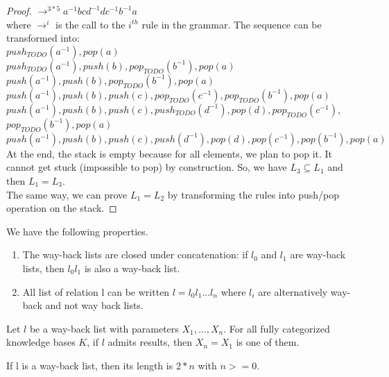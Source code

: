 \documentclass[10pt,a4paper,draft]{article}
\begin{document}
\begin{proof}
$\rightarrow^{3*5} a^{-1} b c d^{-1} d c^{-1} b^{-1} a$ \\
where $\rightarrow^i$ is the call to the $i^{th}$ rule in the grammar. The sequence can be transformed into: \\
$push_{TODO}(a^{-1}), pop(a)$ \\
$push_{TODO}(a^{-1}), push(b), pop_{TODO}(b^{-1}), pop(a)$ \\
$push(a^{-1}), push(b), pop_{TODO}(b^{-1}), pop(a)$ \\
$push(a^{-1}), push(b), push(c), pop_{TODO}(c^{-1}), pop_{TODO}(b^{-1}), pop(a)$ \\
$push(a^{-1}), push(b), push(c), push_{TODO}(d^{-1}), pop(d), pop_{TODO}(c^{-1}),$ \\
$pop_{TODO}(b^{-1}), pop(a)$ \\
$push(a^{-1}), push(b), push(c), push(d^{-1}), pop(d), pop(c^{-1}), pop(b^{-1}), pop(a)$ \\
At the end, the stack is empty because for all elements, we plan to pop it. It cannot get stuck (impossible to pop) by construction. So, we have $L_3 \subseteq L_1$ and then $L_1 = L_3$.\\
The same way, we can prove $L_1 = L_2$ by transforming the rules into push/pop operation on the stack.
\end{proof}

\begin{property}
We have the following properties.
\begin{enumerate}
\item The way-back lists are closed under concatenation: if $l_0$ and $l_1$ are way-back lists, then $l_0 l_1$ is also a way-back list.
\item \label{decompositionWBL} All list of relation l can be written $l = l_0 l_1 ... l_n$ where $l_i$ are alternatively way-back and not way back lists.
\end{enumerate}
\end{property}

\begin{theorem}
\label{comebacktheorem}
Let $l$ be a way-back list with parameters $X_1,...,X_n$. For all fully categorized knowledge bases $K$, if $l$ admits results, then $X_n = X_1$ is one of them.
\end{theorem}

\begin{lemma}
If l is a way-back list, then its length is $2*n$ with $n >= 0$.
\end{lemma}
\end{document}
